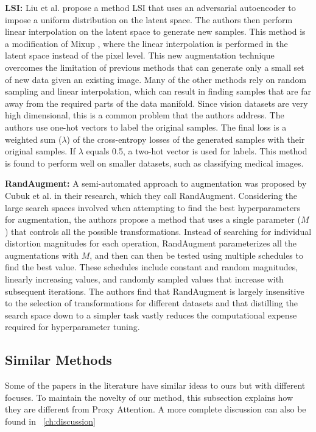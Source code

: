\documentclass[a4paper,11pt,openright]{book}
\begin{document}
\textbf{LSI: }
Liu et al. \cite{liuDataAugmentationLatent2018} propose a method LSI that uses an adversarial autoencoder to impose a uniform distribution on the latent space. The authors then perform linear interpolation on the latent space to generate new samples. This method is a modification of Mixup \cite{zhangMixupEmpiricalRisk2018}, where the linear interpolation is performed in the latent space instead of the pixel level. This new augmentation technique overcomes the limitation of previous methods that can generate only a small set of new data given an existing image. Many of the other methods rely on random sampling and linear interpolation, which can result in finding samples that are far away from the required parts of the data manifold. Since vision datasets are very high dimensional, this is a common problem that the authors address. The authors use one-hot vectors to label the original samples. The final loss is a weighted sum ($\lambda$) of the cross-entropy losses of the generated samples with their original samples. If $\lambda$ equals 0.5, a two-hot vector is used for labels. This method is found to perform well on smaller datasets, such as classifying medical images.

\textbf{RandAugment: }
A semi-automated approach to augmentation was proposed by Cubuk et al. \cite{cubukRandaugmentPracticalAutomated2020} in their research, which they call RandAugment. Considering the large search spaces involved when attempting to find the best hyperparameters for augmentation, the authors propose a method that uses a single parameter ($M$) that controls all the possible transformations. Instead of searching for individual distortion magnitudes for each operation, RandAugment parameterizes all the augmentations with $M$, and then can then be tested using multiple schedules to find the best value. These schedules include constant and random magnitudes, linearly increasing values, and randomly sampled values that increase with subsequent iterations. The authors find that RandAugment is largely insensitive to the selection of transformations for different datasets and that distilling the search space down to a simpler task vastly reduces the computational expense required for hyperparameter tuning.


\subsection{Similar Methods}
Some of the papers in the literature have similar ideas to ours but with different focuses. To maintain the novelty of our method, this subsection explains how they are different from Proxy Attention. A more complete discussion can also be found in ~\ref{ch:discussion}
\end{document}
